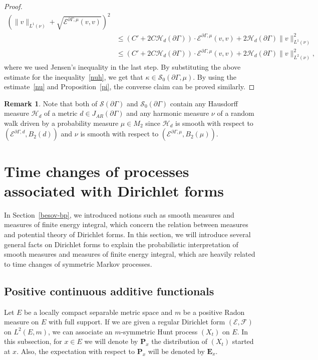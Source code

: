 \documentclass[10pt]{amsart}
\theoremstyle{definition}\newtheorem{defi}[theo]{Definition}\newtheorem{rema}[theo]{Remark}\newtheorem{exam}[theo]{Example}\newtheorem{exem}[theo]{Example}\newtheorem{nota}[theo]{Notation}
\newcommand{\ce}{\mathcal{E}}
\newcommand{\cf}{\mathcal{F}}
\newcommand{\cs}{\mathcal{S}}
\newcommand{\ch}{\mathcal{H}}
\newcommand{\bfE}{\mathbf{E}}
\newcommand{\bfP}{\mathbf{P}}
\begin{document}
\begin{proof}
\begin{align*}
\left(\|v\|_{L^1(\nu)}+\sqrt{\ce^{\partial\Gamma,\mu}(v,v)}\right)^2\\
&\leq \left(C'+2C\ch_{d}(\partial\Gamma) \right)\cdot \ce^{\partial\Gamma,\mu}(v,v) +2\ch_{d}(\partial\Gamma)\|v\|^2_{L^1(\nu)}\\
&\leq \left(C'+2C\ch_{d}(\partial\Gamma) \right)\cdot \ce^{\partial\Gamma,\mu}(v,v) +2\ch_{d}(\partial\Gamma)\|v\|^2_{L^2(\nu)},
\end{align*}
where we used Jensen's inequality in the last step. By substituting the above estimate for the inequality~\eqref{nuh}, we get that $\kappa\in\cs_0(\partial\Gamma,\mu)$. By using the estimate~\eqref{nu} and Proposition~\ref{pi}, the converse claim can be proved similarly.
\end{proof}


\begin{rema}\label{rem6}
Note that both of $\cs(\partial \Gamma)$ and $\cs_0(\partial\Gamma)$ contain any Hausdorff measure $\ch_{d}$ of a metric $d\in J_{AR}(\partial\Gamma)$ and any harmonic measure $\nu$ of a random walk driven by a probability measure $\mu\in M_2$ since $\ch_{d}$ is smooth with respect to $(\ce^{\partial\Gamma,d},B_2(d))$ and $\nu$ is smooth with respect to $(\ce^{\partial\Gamma,\mu},B_2(\mu))$.
\end{rema}


\section{Time changes of processes associated with Dirichlet forms}\label{time-change}
In Section~\ref{besov-bp}, we introduced notions such as smooth measures and measures of finite energy integral, which concern the relation between measures and potential theory of Dirichlet forms. In this section, we will introduce several general facts on Dirichlet forms to explain the probabilistic interpretation of smooth measures and measures of finite energy integral, which are heavily related to time changes of symmetric Markov processes.



\subsection{Positive continuous additive functionals}\label{ssc:pcaf}



Let $E$ be a locally compact separable metric space and $m$ be a positive Radon measure on $E$ with full support. If we are given a regular Dirichlet form $(\ce,\cf)$ on $L^2(E,m)$, we can associate an $m$-symmetric Hunt process $(X_t)$ on $E$. In this subsection, for $x\in E$ we will denote by $\bfP_x$ the distribution of $(X_t)$ started at $x$. Also, the expectation with respect to $\bfP_x$ will be denoted by $\bfE_x$.
\end{document}
